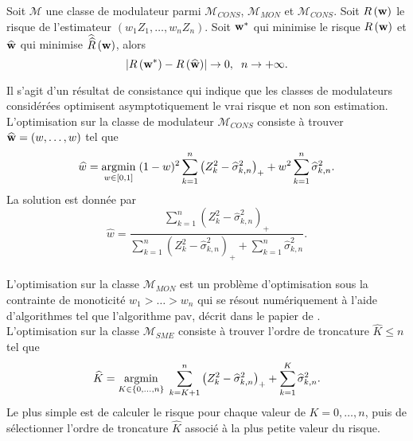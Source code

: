 \begin{Theo}\label{BreanDumbgenTheo}
Soit $\mathcal{M}$ une classe de modulateur parmi $\mathcal{M}_{CONS}$, $\mathcal{M}_{MON}$ et $\mathcal{M}_{CONS}$. Soit $R\left(\bold{w}\right)$ le risque de l\rq{}estimateur $(w_{1}Z_{1},\ldots,w_{n}Z_{n})$. Soit $\bold{w}^{*}$ qui minimise le risque $R\left(\bold{w}\right)$ et $\widehat{\bold{w}}$ qui minimise $\widehat{\widehat{R}}\left(\bold{w}\right)$, alors 
\begin{equation*}
\left|R\left(\bold{w}^{*}\right)-R\left(\widehat{\bold{w}}\right)\right|\rightarrow 0,\hspace{0.2cm}n\rightarrow+\infty.
\end{equation*}
\end{Theo} 
Il s\rq{}agit d\rq{}un résultat de consistance qui indique que les classes de modulateurs considérées optimisent asymptotiquement le vrai risque et non son estimation.\\

L\rq{}optimisation sur la classe de modulateur $\mathcal{M}_{CONS}$ consiste à trouver $\widehat{\bold{w}}=(w,\ldots,w)$ tel que 
\begin{equation*}
\widehat{w}=\underset{w\in[0,1]}{\operatorname{argmin}} \hspace{0.1cm}(1-w)^{2}\sum_{k=1}^{n}\left(Z_{k}^{2}-\widehat{\sigma}_{k,n}^{2}\right)_{+}+w^{2}\sum_{k=1}^{n}\widehat{\sigma}_{k,n}^{2}.
\end{equation*}
La solution est donnée par
\begin{equation}\label{OptimalConstantModulator}
\widehat{w}=\frac{\sum_{k=1}^{n}\left(Z_{k}^{2}-\widehat{\sigma}_{k,n}^{2}\right)_{+}}{\sum_{k=1}^{n}\left(Z_{k}^{2}-\widehat{\sigma}_{k,n}^{2}\right)_{+}+\sum_{k=1}^{n}\widehat{\sigma}_{k,n}^{2}}.
\end{equation}
\\

L\rq{}optimisation sur la classe $\mathcal{M}_{MON}$ est un problème d\rq{}optimisation sous la contrainte de monoticité $w_{1}>\ldots>w_{n}$ qui se résout numériquement à l\rq{}aide d\rq{}algorithmes tel que l\rq{}algorithme \gls{pav}, décrit dans le papier de \citet{RoWrDy88}.\\

L\rq{}optimisation sur la classe $\mathcal{M}_{SME}$ consiste à trouver l\rq{}ordre de troncature $\widehat{K}\leq n$ tel que 
\begin{equation}
\widehat{K}=\underset{K\in\{0,\ldots,n\}}{\operatorname{argmin}} \hspace{0.1cm} \sum_{k=K+1}^{n}\left(Z_{k}^{2}-\widehat{\sigma}_{k,n}^{2}\right)_{+}+\sum_{k=1}^{K}\widehat{\sigma}_{k,n}^{2}.
\end{equation}
Le plus simple est de calculer le risque pour chaque valeur de $K=0,\ldots,n$, puis de sélectionner l\rq{}ordre de troncature $\widehat{K}$ associé à la plus petite valeur du risque.\\

